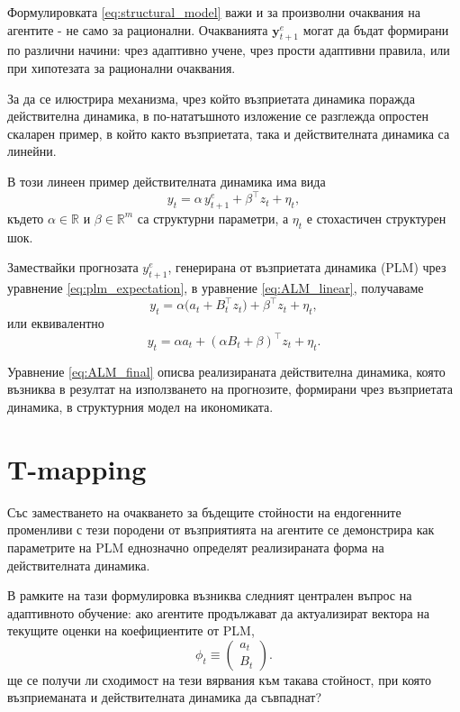 Формулировката \eqref{eq:structural_model} важи и за произволни очаквания на агентите - не само за рационални. Очакванията $\mathbf{y}_{t+1}^e$ могат да бъдат формирани по различни начини: чрез адаптивно учене, чрез прости адаптивни правила, или при хипотезата за рационални очаквания.

За да се илюстрира механизма, чрез който възприетата динамика поражда
действителна динамика, в по-нататъшното изложение се разглежда опростен
скаларен пример, в който както възприетата, така и действителната
динамика са линейни.

В този линеен пример действителната динамика има вида
\begin{equation}
y_t
=
\alpha\, y_{t+1}^e
+
\beta^\top z_{t}
+
\eta_t,
\label{eq:ALM_linear}
\end{equation}
където $\alpha \in \mathbb{R}$ и $\beta \in \mathbb{R}^{m}$ са
структурни параметри, а $\eta_t$ е стохастичен структурен шок.

Замествайки прогнозата $y_{t+1}^e$, генерирана от възприетата динамика (PLM) чрез уравнение \eqref{eq:plm_expectation},
в уравнение \eqref{eq:ALM_linear}, получаваме
\[
y_t
=
\alpha\bigl(a_{t} + B_{t}^\top z_{t}\bigr)
+
\beta^\top z_{t}
+
\eta_t,
\]
или еквивалентно
\begin{equation}
y_t
=
\alpha a_t
+
(\alpha B_t + \beta)^\top z_t
+
\eta_t.
\label{eq:ALM_final}
\end{equation}

Уравнение \eqref{eq:ALM_final} описва реализираната действителна динамика,
която възниква в резултат на използването на прогнозите, формирани чрез
възприетата динамика, в структурния модел на икономиката.


\section{T-mapping}

Със заместването на очакването за бъдещите стойности на ендогенните променливи с тези породени от възприятията на агентите се демонстрира как параметрите на PLM еднозначно определят реализираната форма на действителната динамика.

В рамките на тази формулировка възниква следният централен въпрос на адаптивното обучение: ако агентите продължават да актуализират вектора на текущите оценки на коефициентите от PLM, 
\[
\phi_t \equiv 
\begin{pmatrix} a_t \\ B_t 
\end{pmatrix}. 
\] 
ще се получи ли сходимост на тези вярвания към такава стойност, при която възприеманата и действителната динамика да съвпаднат?

